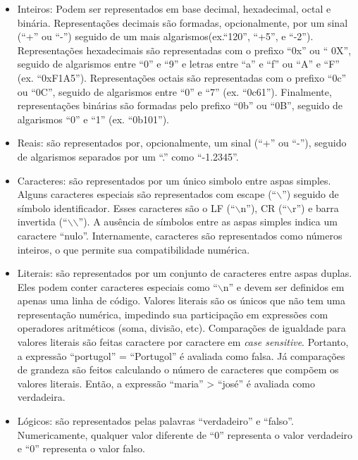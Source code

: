 \documentclass[a4paper,11pt]{report}
\begin{document}
\begin{itemize}
  \item Inteiros: Podem ser representados em base decimal, hexadecimal, octal e
    binária. Representações decimais são formadas, opcionalmente, por um sinal
    (``+'' ou ``-'') seguido de um mais algarismos(ex.``120'', ``+5'', e
    ``-2''). Representações hexadecimais são representadas com o prefixo ``0x''
    ou `` 0X'', seguido de algarismos entre ``0'' e ``9'' e letras entre ``a'' e
    ``f'' ou ``A'' e ``F'' (ex. ``0xF1A5''). Representações octais são
    representadas com o prefixo ``0c'' ou ``0C'', seguido de algarismos entre
    ``0'' e ``7'' (ex. ``0c61''). Finalmente, representações binárias são
    formadas pelo prefixo ``0b'' ou ``0B'', seguido de algarismos ``0'' e ``1''
    (ex. ``0b101'').
  \item Reais: são representados por, opcionalmente, um sinal (``+'' ou ``-''),
    seguido de algarismos separados por um ``.'' como ``-1.2345''.
  \item Caracteres: são representados por um único simbolo entre aspas simples.
    Alguns caracteres especiais são representados com escape (``$\backslash$'')
    seguido de símbolo identificador. Esses caracteres são o LF
    (``$\backslash$n''), CR (``$\backslash$r'') e barra invertida
    (``$\backslash$$\backslash$''). A ausência de símbolos entre as aspas
    simples indica um caractere ``nulo''. Internamente, caracteres são
    representados como números inteiros, o que permite sua compatibilidade
    numérica.
  \item Literais: são representados por um conjunto de caracteres entre aspas
    duplas. Eles podem conter caracteres especiais como ``$\backslash$n'' e
    devem ser definidos em apenas uma linha de código. Valores literais são os
    únicos que não tem uma representação numérica, impedindo sua participação em
    expressões com operadores aritméticos (soma, divisão, etc). Comparações de
    igualdade para valores literais são feitas caractere por caractere em
    \textit{case sensitive}. Portanto, a expressão ``portugol'' = ``Portugol'' é
    avaliada como falsa. Já comparações de grandeza são feitos calculando o
    número de caracteres que compõem os valores literais. Então, a expressão
    ``maria'' > ``josé'' é avaliada como verdadeira.
  \item Lógicos: são representados pelas palavras ``verdadeiro'' e ``falso''.
    Numericamente, qualquer valor diferente de ``0'' representa o valor
    verdadeiro e ``0'' representa o valor falso.
\end{itemize}
\end{document}

